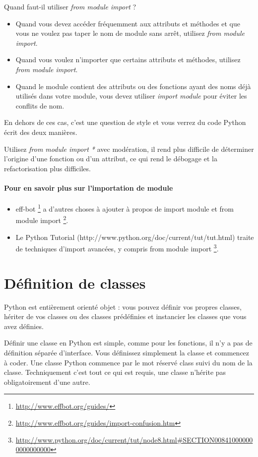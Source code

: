 \medskip
Quand faut-il utiliser \emph{from module import} ?
\begin{itemize}
\item Quand vous devez accéder fréquemment aux attributs et méthodes et que vous ne voulez pas taper le nom de module sans arrêt, utilisez \emph{from module import}.
\item Quand vous voulez n'importer que certains attributs et méthodes, utilisez \emph{from module import}.
\item Quand le module contient des attributs ou des fonctions ayant des noms déjà utilisés dans votre module, vous devez utiliser \emph{import module} pour éviter les conflits de nom.
\end{itemize}

En dehors de ces cas, c'est une question de style et vous verrez du code Python écrit des deux manières.

{Utilisez \emph{from module import *} avec modération, il rend plus difficile de déterminer l'origine d'une fonction ou d'un attribut, ce qui rend le débogage et la refactorisation plus difficiles.}

\paragraph{Pour en savoir plus sur l'importation de module}
\begin{itemize}
\item eff-bot \footnote{\url{http://www.effbot.org/guides/}} a d'autres choses à ajouter à propos de import module et from module import \footnote{\url{http://www.effbot.org/guides/import-confusion.htm}}.
\item Le Python Tutorial (http://www.python.org/doc/current/tut/tut.html) traite de techniques d'import avancées, y compris from module import \footnote{\url{http://www.python.org/doc/current/tut/node8.html\#SECTION008410000000000000000}}.
\end{itemize}

\section{Définition de classes}

Python est entièrement orienté objet : vous pouvez définir vos propres classes, hériter de vos classes ou des classes prédéfinies et instancier les classes que vous avez définies.

Définir une classe en Python est simple, comme pour les fonctions, il n'y a pas de définition séparée d'interface. Vous définissez simplement la classe et  commencez à coder. Une classe Python commence par le mot réservé class suivi du nom de la classe. Techniquement c'est tout ce qui est requis, une classe n'hérite pas obligatoirement d'une autre.

